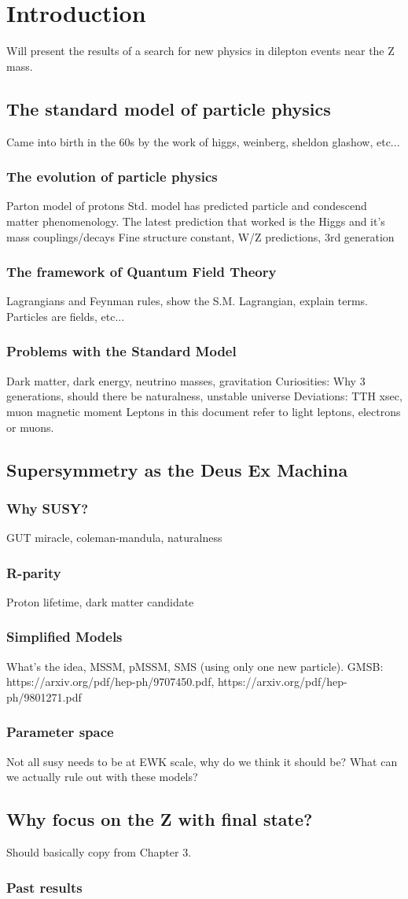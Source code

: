 \chapter{Introduction}
  Will present the results of a search for new physics in dilepton events near the Z mass.
\section{The standard model of particle physics}
  Came into birth in the 60s by the work of higgs, weinberg, sheldon glashow, etc...
  \subsection{The evolution of particle physics}
    Parton model of protons
    Std. model has predicted particle and condescend matter phenomenology. The latest prediction that worked is the Higgs and it's mass couplings/decays
    Fine structure constant, W/Z predictions, 3rd generation
  \subsection{The framework of Quantum Field Theory}
    Lagrangians and Feynman rules, show the S.M. Lagrangian, explain terms. Particles are fields, etc...
  \subsection{Problems with the Standard Model}
    Dark matter, dark energy, neutrino masses, gravitation
    Curiosities: Why 3 generations, should there be naturalness, unstable universe
    Deviations: TTH xsec, muon magnetic moment
  Leptons in this document refer to light leptons, electrons or muons.
\section{Supersymmetry as the Deus Ex Machina}
  \subsection{Why SUSY?}
    GUT miracle, coleman-mandula, naturalness
  \subsection{R-parity} \label{sec:r-parity}
    Proton lifetime, dark matter candidate
  \subsection{Simplified Models}
    What's the idea, MSSM, pMSSM, SMS (using only one new particle).
    GMSB: https://arxiv.org/pdf/hep-ph/9707450.pdf, https://arxiv.org/pdf/hep-ph/9801271.pdf
  \subsection{Parameter space}
    Not all susy needs to be at EWK scale, why do we think it should be? What can we actually rule out with these models?
\section{Why focus on the Z with \MET final state?}
  Should basically copy from Chapter 3.
  \subsection{Past results}
